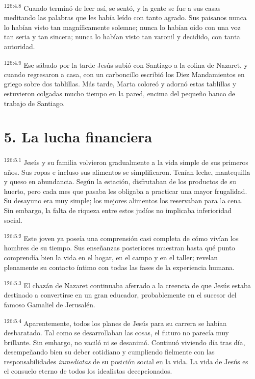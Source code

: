 \par 
\textsuperscript{126:4.8} Cuando terminó de leer así, se sentó, y la gente se fue a sus casas meditando las palabras que les había leído con tanto agrado. Sus paisanos nunca lo habían visto tan magníficamente solemne; nunca lo habían oído con una voz tan seria y tan sincera; nunca lo habían visto tan varonil y decidido, con tanta autoridad.

\par 
\textsuperscript{126:4.9} Ese sábado por la tarde Jesús subió con Santiago a la colina de Nazaret, y cuando regresaron a casa, con un carboncillo escribió los Diez Mandamientos en griego sobre dos tablillas. Más tarde, Marta coloreó y adornó estas tablillas y estuvieron colgadas mucho tiempo en la pared, encima del pequeño banco de trabajo de Santiago.

\section*{5. La lucha financiera}
\par 
\textsuperscript{126:5.1} Jesús y su familia volvieron gradualmente a la vida simple de sus primeros años. Sus ropas e incluso sus alimentos se simplificaron. Tenían leche, mantequilla y queso en abundancia. Según la estación, disfrutaban de los productos de su huerto, pero cada mes que pasaba les obligaba a practicar una mayor frugalidad. Su desayuno era muy simple; los mejores alimentos los reservaban para la cena. Sin embargo, la falta de riqueza entre estos judíos no implicaba inferioridad social.

\par 
\textsuperscript{126:5.2} Este joven ya poseía una comprensión casi completa de cómo vivían los hombres de su tiempo. Sus enseñanzas posteriores muestran hasta qué punto comprendía bien la vida en el hogar, en el campo y en el taller; revelan plenamente su contacto íntimo con todas las fases de la experiencia humana.

\par 
\textsuperscript{126:5.3} El chazán de Nazaret continuaba aferrado a la creencia de que Jesús estaba destinado a convertirse en un gran educador, probablemente en el sucesor del famoso Gamaliel de Jerusalén.

\par 
\textsuperscript{126:5.4} Aparentemente, todos los planes de Jesús para su carrera se habían desbaratado. Tal como se desarrollaban las cosas, el futuro no parecía muy brillante. Sin embargo, no vaciló ni se desanimó. Continuó viviendo día tras día, desempeñando bien su deber cotidiano y cumpliendo fielmente con las responsabilidades \textit{inmediatas} de su posición social en la vida. La vida de Jesús es el consuelo eterno de todos los idealistas decepcionados.

